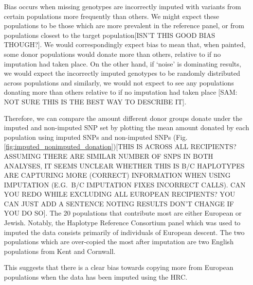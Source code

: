 Bias occurs when missing genotypes are incorrectly imputed with variants from certain populations more frequently than others. We might expect these populations to be those which are more prevalent in the reference panel, {\color{red}or from populations closest to the target population[ISN'T THIS GOOD BIAS THOUGH?]}.  We would correspondingly expect bias to mean that, when painted, some donor populations would donate more than others, relative to if no imputation had taken place. On the other hand, if `noise' is dominating results, we would expect the incorrectly imputed genotypes to be randomly distributed across populations and similarly, we would not expect to see any populations donating more than others relative to if no imputation had taken place [SAM: NOT SURE THIS IS THE BEST WAY TO DESCRIBE IT].

Therefore, we can compare the amount different donor groups donate under the imputed and non-imputed SNP set by plotting the mean amount donated by each population using imputed SNPs and non-imputed SNPs (Fig. \ref{fig:imputed_nonimputed_donation}){\color{red}[THIS IS ACROSS ALL RECIPIENTS? ASSUMING THERE ARE SIMILAR NUMBER OF SNPS IN BOTH ANALYSES, IT SEEMS UNCLEAR WHETHER THIS IS B/C HAPLOTYPES ARE CAPTURING MORE (CORRECT) INFORMATION WHEN USING IMPUTATION (E.G.\ B/C IMPUTATION FIXES INCORRECT CALLS). CAN YOU REDO WHILE EXCLUDING ALL EUROPEAN RECIPIENTS? YOU CAN JUST ADD A SENTENCE NOTING RESULTS DON'T CHANGE IF YOU DO SO]}. The 20 populations that contribute most are either European or Jewish. Notably, the Haplotype Reference Consortium panel which was used to imputed the data consists primarily of individuals of European descent. The two populations which are over-copied the most after imputation are two English populations from Kent and Cornwall. 

This suggests that there is a clear bias towards copying more from European populations when the data has been imputed using the HRC. 


